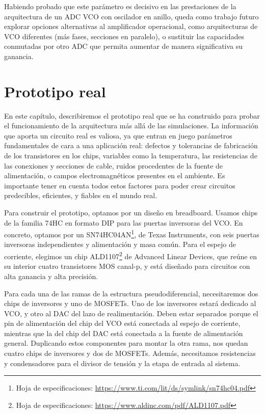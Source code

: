 \documentclass[12pt]{report} %
\begin{document}
	Habiendo probado que este parámetro es decisivo en las prestaciones de la arquitectura de un ADC VCO con oscilador en anillo, queda como trabajo futuro explorar opciones alternativas al amplificador operacional, como arquitecturas de VCO diferentes (más fases, secciones en paralelo), o sustituir las capacidades conmutadas por otro ADC que permita aumentar de manera significativa su ganancia.

\chapter{Prototipo real}

	En este capítulo, describiremos el prototipo real que se ha construido para probar el funcionamiento de la arquitectura más allá de las simulaciones. La información que aporta un circuito real es valiosa, ya que entran en juego parámetros fundamentales de cara a una aplicación real: defectos y tolerancias de fabricación de los transistores en los chips, variables como la temperatura, las resistencias de las conexiones y secciones de cable, ruidos procedentes de la fuente de alimentación, o campos electromagnéticos presentes en el ambiente. Es importante tener en cuenta todos estos factores para poder crear circuitos predecibles, eficientes, y fiables en el mundo real.
	
	Para construir el prototipo, optamos por un diseño en breadboard. Usamos chips de la familia 74HC en formato DIP para las puertas inversoras del VCO. En concreto, optamos por un SN74HC04AN\footnote{Hoja de especificaciones: \url{https://www.ti.com/lit/ds/symlink/sn74hc04.pdf}}, de Texas Instruments, con seis puertas inversoras independientes y alimentación y masa común. Para el espejo de corriente, elegimos un chip ALD1107\footnote{Hoja de especificaciones: \url{https://www.aldinc.com/pdf/ALD1107.pdf}} de Advanced Linear Devices, que reúne en su interior cuatro transistores MOS canal-p, y está diseñado para circuitos con alta ganancia y alta precisión.
	
	Para cada una de las ramas de la estructura pseudodiferencial, necesitaremos dos chips de inversores y uno de MOSFETs. Uno de los inversores estará dedicado al VCO, y otro al DAC del lazo de realimentación. Deben estar separados porque el pin de alimentación del chip del VCO está conectada al espejo de corriente, mientras que la del chip del DAC está conectada a la fuente de alimentación general. Duplicando estos componentes para montar la otra rama, nos quedan cuatro chips de inversores y dos de MOSFETs. Además, necesitamos resistencias y condensadores para el divisor de tensión y la etapa de entrada al sistema.
	
\end{document}
